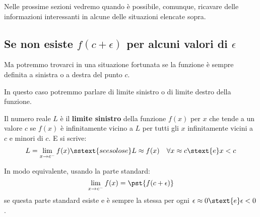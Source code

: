 Nelle prossime sezioni vedremo quando è possibile, comunque, ricavare delle 
informazioni interessanti in alcune delle situazioni elencate sopra.

\subsection{Se non esiste \(f(c+\epsilon)\) per alcuni valori di 
\(\epsilon\)}
\label{subsec:cont_limiti_nonsempreesiste}


Ma potremmo trovarci in una situazione fortunata se la funzione è sempre 
definita a sinistra o a destra del punto \(c\).

In questo caso potremmo parlare di limite sinistro o di limite destro della 
funzione.


\begin{definizione}
Il numero reale \(L\) è il \textbf{limite sinistro} della funzione \(f(x)\) 
per \(x\) che tende a un valore \(c\) se \(f(x)\) è infinitamente vicino a 
\(L\) per tutti gli \(x\) infinitamente vicini a \(c\) e minori di 
\(c\). \quad 
E si scrive:
\[L = \lim_{x \rightarrow c^-} f(x) \sstext{se e solo se} 
L \approx {f(x)} \quad 
\forall x \approx c \stext{ e } x < c\]

In modo equivalente, usando la parte standard: 
\[\lim_{x \to c^-} f(x) = \pst{f(c+\epsilon)}\]
se questa parte standard esiste e è sempre la stessa 
per ogni \(\epsilon \approx 0 \stext{ e } \epsilon < 0\).
\end{definizione}

